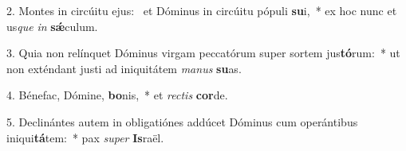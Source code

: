 2. Montes in circúitu ejus: \dag\  et Dóminus in circúitu pópuli \textbf{su}i,~*  ex hoc nunc et us\textit{que} \textit{in} \textbf{sǽ}culum.\

3. Quia non relínquet Dóminus virgam peccatórum super sortem jus\textbf{tó}rum:~*  ut non exténdant justi ad iniquitátem \textit{ma}\textit{nus} \textbf{su}as.\

4. Bénefac, Dómine, \textbf{bo}nis,~*  et \textit{rec}\textit{tis} \textbf{cor}de.\

5. Declinántes autem in obligatiónes addúcet Dóminus cum operántibus iniqui\textbf{tá}tem:~*  pax \textit{su}\textit{per} \textbf{Is}raël.\

